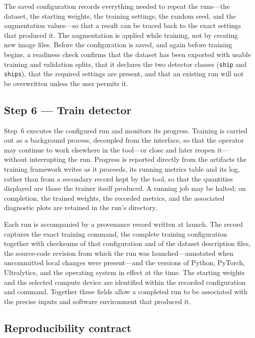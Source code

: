 \documentclass[10pt, letterpaper, twocolumn]{article}
\begin{document}
The saved configuration records everything needed to repeat the runs---the dataset, the starting weights, the training settings, the random seed, and the augmentation values---so that a result can be traced back to the exact settings that produced it. The augmentation is applied while training, not by creating new image files. Before the configuration is saved, and again before training begins, a readiness check confirms that the dataset has been exported with usable training and validation splits, that it declares the two detector classes (\texttt{ship} and \texttt{ships}), that the required settings are present, and that an existing run will not be overwritten unless the user permits it.

\subsection{Step 6 --- Train detector}

Step~6 executes the configured run and monitors its progress. Training is carried out as a background process, decoupled from the interface, so that the operator may continue to work elsewhere in the tool---or close and later reopen it---without interrupting the run. Progress is reported directly from the artifacts the training framework writes as it proceeds, its running metrics table and its log, rather than from a secondary record kept by the tool, so that the quantities displayed are those the trainer itself produced. A running job may be halted; on completion, the trained weights, the recorded metrics, and the associated diagnostic plots are retained in the run's directory.

Each run is accompanied by a provenance record written at launch. The record captures the exact training command, the complete training configuration together with checksums of that configuration and of the dataset description files, the source-code revision from which the run was launched---annotated when uncommitted local changes were present---and the versions of Python, PyTorch, Ultralytics, and the operating system in effect at the time. The starting weights and the selected compute device are identified within the recorded configuration and command. Together these fields allow a completed run to be associated with the precise inputs and software environment that produced it.

\subsection{Reproducibility contract}
\end{document}
